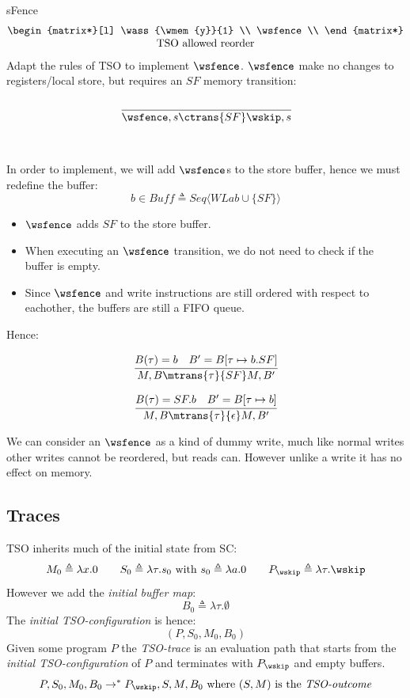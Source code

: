 \begin{examplebox}{sFence}
\[\begin{matrix}
\begin{matrix*}[l]
            \wass{\wmem{y}}{1} \\
            \wsfence \\
        \end{matrix*} \\
        \text{TSO allowed reorder}
    \end{matrix}\]
    Adapt the rules of TSO to implement $\wsfence$.
    \tcblower
    $\wsfence$ make no changes to registers/local store, but requires an $SF$ memory transition:
    \[\cfrac{}{
        \wsfence, s \ctrans{SF} \wskip, s
    }\]
    \\
    \\ In order to implement, we will add $\wsfence$s to the store buffer, hence we must redefine the buffer:
    \[b \in Buff \triangleq Seq \langle WLab \cup \{SF\}\rangle\]

    \begin{itemize}
        \item $\wsfence$ adds $SF$ to the store buffer.
        \item When executing an $\wsfence$ transition, we do not need to check if the buffer is empty.
        \item Since $\wsfence$ and write instructions are still ordered with respect to eachother, the buffers are still a FIFO queue.
    \end{itemize}
    Hence:
    \\ \begin{minipage}{.5\textwidth}
        \[\cfrac{
            B(\tau) = b \quad B' = B[\tau \mapsto b.SF]
        }{
            M, B \mtrans{\tau}{SF} M, B'
        }\]
    \end{minipage}
    \begin{minipage}{.5\textwidth}
        \[\cfrac{
            B(\tau) = SF.b \quad B' = B[\tau \mapsto b]
        }{
            M, B \mtrans{\tau}{\epsilon} M, B'
        }\]
    \end{minipage}
    We can consider an $\wsfence$ as a kind of dummy write, much like normal writes other writes cannot be reordered, but reads can. However unlike a write it has no effect on memory.
\end{examplebox}

\subsection{Traces}
TSO inherits much of the initial state from SC:
\[M_0 \triangleq \lambda x . 0 \qquad S_0 \triangleq \lambda \tau . s_0 \text{ with } s_0 \triangleq \lambda a . 0 \qquad P_{\wskip} \triangleq \lambda \tau. \wskip\]
However we add the \textit{initial buffer map}:
\[B_0 \triangleq \lambda \tau . \emptyset\]
The \textit{initial TSO-configuration} is hence:
\[(P, S_0, M_0, B_0)\]
Given some program $P$ the \textit{TSO-trace} is an evaluation path that starts from the \textit{initial TSO-configuration} of $P$ and terminates with $P_{\wskip}$ and empty buffers.
\[P, S_0, M_0, B_0 \to^* P_{\wskip}, S, M, B_0 \text{ where } (S, M) \text{ is the \textit{TSO-outcome}}\]

